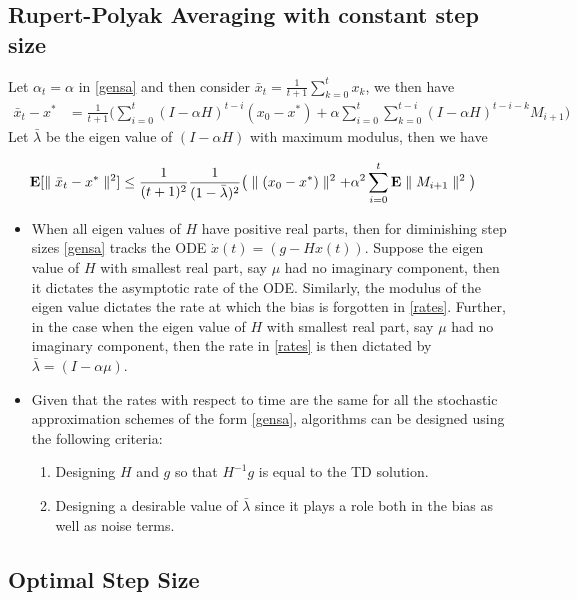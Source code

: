 \subsection{Rupert-Polyak Averaging with constant step size}
Let $\alpha_t=\alpha$ in \eqref{gensa} and then consider $\bar{x}_t=\frac{1}{t+1}\sum_{k=0}^t x_k$, we then have
\begin{align*}
\bar{x}_t-x^*&=\frac{1}{t+1}\big(\sum_{i=0}^t (I-\alpha H)^{t-i}(x_0-x^*)+\alpha \sum_{i=0}^t \sum_{k=0}^{t-i} (I-\alpha H)^{t-i-k} M_{i+1}\big)
\end{align*}
Let $\bar{\lambda}$ be the eigen value of $(I-\alpha H)$ with maximum modulus, then we have
\begin{comment}
\begin{align*}
\begin{split}
|\E[\bar{x}_t-x^*]|&=|\frac{1}{t+1}\big(\sum_{i=0}^t (I-\alpha H)^{t-i}(x_0-x^*)|\\
&\leq \frac{1}{t+1}\frac{1}{1-\bar{\lambda}}|x_0-x^*|
\end{split}
\end{align*}
\end{comment}
\begin{align}\label{rates}
\mathbf{E}[\parallel\bar{x}_t-x^*\parallel^2]&\leq\frac{1}{(t+1)^2}\frac{1}{(1-\bar{\lambda})^2} \big(\parallel(x_0-x^*)\parallel^2+ \alpha^2\sum_{i=0}^t \mathbf{E}\parallel M_{i+1}\parallel^2\big)
\end{align}
\begin{itemize}
\item When all eigen values of $H$ have positive real parts, then for diminishing step sizes \eqref{gensa} tracks the ODE $\dot{x}(t)=(g-Hx(t))$. Suppose the eigen value of $H$ with smallest real part, say $\mu$ had no imaginary component, then it dictates the asymptotic rate of the ODE. Similarly, the modulus of the eigen value dictates the rate at which the bias is forgotten in \eqref{rates}. Further, in the case when the eigen value of $H$ with smallest real part, say $\mu$ had no imaginary component, then the rate in \eqref{rates} is then dictated by $\bar{\lambda}=(I-\alpha\mu)$. 
\item Given that the rates with respect to time are the same for all the stochastic approximation schemes of the form \eqref{gensa}, algorithms can be designed using the following criteria:
\begin{enumerate}
\item Designing $H$ and $g$ so that $H^{-1}g$ is equal to the TD solution.
\item Designing a desirable value of $\bar{\lambda}$ since it plays a role both in the bias as well as noise terms. 
\end{enumerate}
\end{itemize}

\subsection{Optimal Step Size}